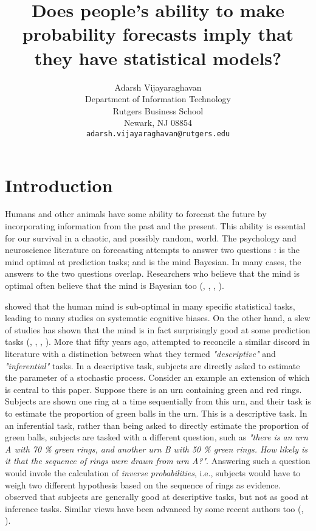 \documentclass{article}
\title{Does people's ability to make probability forecasts imply that they have statistical models?}
\author{  
 Adarsh Vijayaraghavan \\
  Department of Information Technology\\
  Rutgers Business School\\
  Newark, NJ 08854 \\
  \texttt{adarsh.vijayaraghavan@rutgers.edu} \\
}
\begin{document}
\maketitle

\section{Introduction}
Humans and other animals have some ability to forecast the future by incorporating information from the past and the present. This ability is essential for our survival in a chaotic, and possibly random, world. The psychology and neuroscience literature on forecasting attempts to answer two questions : is the mind optimal at prediction tasks; and is the mind Bayesian. In many cases, the answers to the two questions overlap. Researchers who believe that the mind is optimal often believe that the mind is Bayesian too (\cite{kording2014bayesian}, \cite{knill2004bayesian}, \cite{nassar2010approximately}, \cite{edwards2012bayesian}). 

\cite{kahnemantversky1979} showed that the human mind is sub-optimal in many specific statistical tasks, leading to many studies on systematic cognitive biases. On the other hand, a slew of studies has shown that the mind is in fact surprisingly good at some prediction tasks (\cite{peterson1967man}, \cite{anderson1991human}, \cite{bogacz2007optimal}, \cite{griffiths2006optimal}). More that fifty years ago, \cite{peterson1967man} attempted to reconcile a similar discord in literature with a distinction between what they termed \textit{"descriptive"} and \textit{"inferential"} tasks. In a descriptive task, subjects are directly asked to estimate the parameter of a stochastic process. Consider an example an extension of which is central to this paper. Suppose there is an urn containing green and red rings. Subjects are shown one ring at a time sequentially from this urn, and their task is to estimate the proportion of green balls in the urn. This is a descriptive task. In an inferential task, rather than being asked to directly estimate the proportion of green balls, subjects are tasked with a different question, such as \textit{"there is an urn A with 70 \% green rings, and another urn B with 50 \% green rings. How likely is it that the sequence of rings were drawn from urn A?"}. Answering such a question would invole the calculation of \textit{inverse probabilities}, i.e., subjects would have to weigh two different hypothesis based on the sequence of rings as evidence. \cite{peterson1967man} observed that subjects are generally good at descriptive tasks, but not as good at inference tasks. Similar views have been advanced by some recent authors too (\cite{brown2009detecting}, \cite{gallistel2014perception}).
\end{document}
